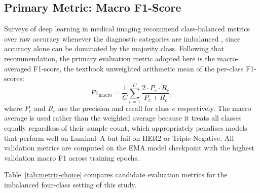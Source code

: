 \subsection{Primary Metric: Macro F1-Score}
\label{sec:macro-f1}

Surveys of deep learning in medical imaging recommend
class-balanced metrics over raw accuracy whenever the
diagnostic categories are imbalanced \cite{litjens2017survey},
since accuracy alone can be dominated by the majority class.
Following that recommendation, the primary evaluation metric
adopted here is the macro-averaged F1-score, the textbook
unweighted arithmetic mean of the per-class F1-scores:
\begin{equation}
  F1_{\mathrm{macro}}
  = \frac{1}{C}
    \sum_{c=1}^{C}
    \frac{2 \cdot P_c \cdot R_c}{P_c + R_c},
  \label{eq:macro-f1}
\end{equation}
where $P_c$ and $R_c$ are the precision and recall for
class $c$ respectively.
The macro average is used rather than the weighted average
because it treats all classes equally regardless of their
sample count, which appropriately penalises models that
perform well on Luminal~A but fail on HER2 or
Triple-Negative.
All validation metrics are computed on the EMA model
checkpoint with the highest validation macro F1 across
training epochs.

Table~\ref{tab:metric-choice} compares candidate
evaluation metrics for the imbalanced four-class
setting of this study.

\begin{table}[htbp]
  \centering
  \caption{Comparison of candidate evaluation metrics
    for the imbalanced breast MRI four-class task.
    Macro F1 is selected as the primary metric because
    it equally penalises failure on all four subtypes
    regardless of class frequency.}
  \label{tab:metric-choice}
  \renewcommand{\arraystretch}{1.3}
\end{table}


